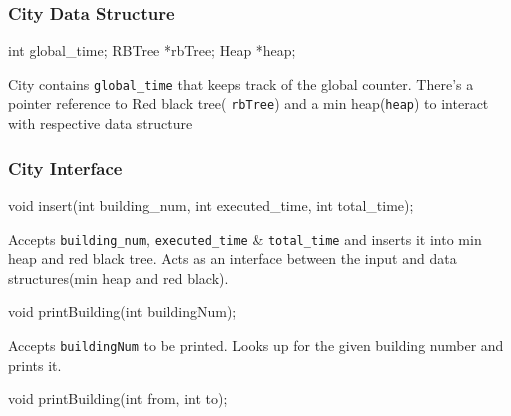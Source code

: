 \documentclass[
]{article}
\newenvironment{Shaded}{}{}
\newcommand{\DataTypeTok}[1]{\textcolor[rgb]{0.56,0.13,0.00}{#1}}
\newcommand{\NormalTok}[1]{#1}
\begin{document}
\hypertarget{city-data-structure}{%
\subsubsection{City Data Structure}\label{city-data-structure}}

\begin{Shaded}
\begin{Highlighting}[]
\DataTypeTok{int}\NormalTok{ global_time;}
\NormalTok{RBTree *rbTree;}
\NormalTok{Heap *heap;}
\end{Highlighting}
\end{Shaded}

City contains \texttt{global\_time} that keeps track of the global
counter. There's a pointer reference to Red black tree( \texttt{rbTree})
and a min heap(\texttt{heap}) to interact with respective data structure

\hypertarget{city-interface}{%
\subsubsection{City Interface}\label{city-interface}}

\begin{Shaded}
\begin{Highlighting}[]
\DataTypeTok{void}\NormalTok{ insert(}\DataTypeTok{int}\NormalTok{ building_num, }\DataTypeTok{int}\NormalTok{ executed_time, }\DataTypeTok{int}\NormalTok{ total_time);}
\end{Highlighting}
\end{Shaded}

Accepts \texttt{building\_num}, \texttt{executed\_time} \&
\texttt{total\_time} and inserts it into min heap and red black tree.
Acts as an interface between the input and data structures(min heap and
red black).

\begin{Shaded}
\begin{Highlighting}[]
\DataTypeTok{void}\NormalTok{ printBuilding(}\DataTypeTok{int}\NormalTok{ buildingNum);}
\end{Highlighting}
\end{Shaded}

Accepts \texttt{buildingNum} to be printed. Looks up for the given
building number and prints it.

\begin{Shaded}
\begin{Highlighting}[]
\DataTypeTok{void}\NormalTok{ printBuilding(}\DataTypeTok{int}\NormalTok{ from, }\DataTypeTok{int}\NormalTok{ to);}
\end{Highlighting}
\end{Shaded}
\end{document}
